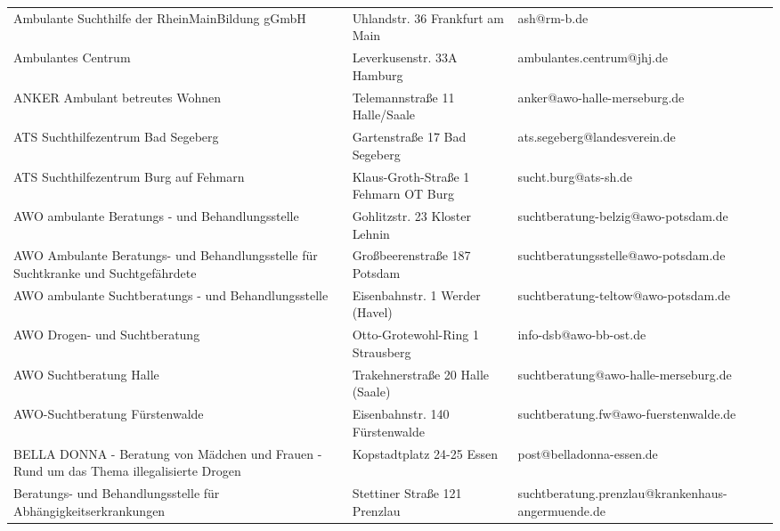 {\begin{xltabular}{\textwidth} {
 >{\raggedright\arraybackslash}p{5cm}
 >{\raggedright\arraybackslash}X
 >{\raggedright\arraybackslash}p{5cm} }
Ambulante Suchthilfe der RheinMainBildung gGmbH & Uhlandstr. 36 Frankfurt am Main & ash@rm-b.de \\
Ambulantes Centrum & Leverkusenstr. 33A Hamburg & ambulantes.centrum@jhj.de \\
ANKER Ambulant betreutes Wohnen & Telemannstraße 11 Halle/Saale & anker@awo-halle-merseburg.de \\
ATS Suchthilfezentrum Bad Segeberg & Gartenstraße 17 Bad Segeberg & ats.segeberg@landesverein.de \\
ATS Suchthilfezentrum Burg auf Fehmarn & Klaus-Groth-Straße 1 Fehmarn OT Burg & sucht.burg@ats-sh.de \\
AWO ambulante Beratungs - und Behandlungsstelle & Gohlitzstr. 23 Kloster Lehnin & suchtberatung-belzig@awo-potsdam.de \\
AWO Ambulante Beratungs- und Behandlungsstelle für Suchtkranke und Suchtgefährdete & Großbeerenstraße 187 Potsdam & suchtberatungsstelle@awo-potsdam.de \\
AWO ambulante Suchtberatungs - und Behandlungsstelle & Eisenbahnstr. 1 Werder (Havel) & suchtberatung-teltow@awo-potsdam.de \\
AWO Drogen- und Suchtberatung & Otto-Grotewohl-Ring 1 Strausberg & info-dsb@awo-bb-ost.de \\
AWO Suchtberatung Halle & Trakehnerstraße 20 Halle (Saale) & suchtberatung@awo-halle-merseburg.de \\
AWO-Suchtberatung Fürstenwalde & Eisenbahnstr. 140 Fürstenwalde & suchtberatung.fw@awo-fuerstenwalde.de \\
BELLA DONNA - Beratung von Mädchen und Frauen - Rund um das Thema illegalisierte Drogen & Kopstadtplatz 24-25 Essen & post@belladonna-essen.de \\
Beratungs- und Behandlungsstelle für Abhängigkeitserkrankungen & Stettiner Straße 121 Prenzlau & suchtberatung.prenzlau@krankenhaus-angermuende.de \\

\end{xltabular}}
